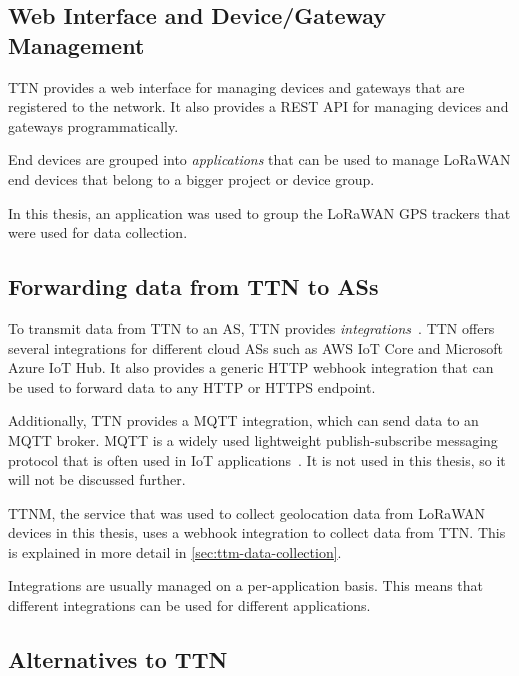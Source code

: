 \subsection{Web Interface and Device/Gateway Management}\label{sec:web-interface-and-device-gateway-management}

\ac{TTN} provides a web interface for managing devices and gateways that are registered to the network.
It also provides a \ac{REST} \ac{API} for managing devices and gateways programmatically.

End devices are grouped into \emph{applications} that can be used to manage \ac{LoRaWAN} end devices that belong to a bigger project or device group.

In this thesis, an application was used to group the \ac{LoRaWAN} \ac{GPS} trackers that were used for data collection.

\subsection{Forwarding data from \acf{TTN} to \acfp{AS}}\label{sec:forwarding-data-from-ttn-to-as}

To transmit data from \ac{TTN} to an \ac{AS}, \ac{TTN} provides \emph{integrations}~\cite{the_things_network_integrations_2021}.
\ac{TTN} offers several integrations for different cloud \acp{AS} such as \ac{AWS} IoT Core and Microsoft Azure IoT Hub.
It also provides a generic \ac{HTTP} webhook integration that can be used to forward data to any \ac{HTTP} or \ac{HTTPS} endpoint.

Additionally, \ac{TTN} provides a MQTT integration, which can send data to an MQTT broker.
MQTT is a widely used lightweight publish-subscribe messaging protocol that is often used in \ac{IoT} applications~\cite{mqtt_mqtt_2022}.
It is not used in this thesis, so it will not be discussed further.

\ac{TTNM}, the service that was used to collect geolocation data from \ac{LoRaWAN} devices in this thesis, uses a webhook integration to collect data from \ac{TTN}.
This is explained in more detail in \cref{sec:ttm-data-collection}.

Integrations are usually managed on a per-application basis.
This means that different integrations can be used for different applications.

\subsection{Alternatives to \acf{TTN}}

